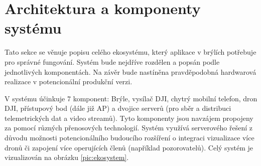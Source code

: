 \section{Architektura a komponenty systému } \label{sec:architektura}
Tato sekce se věnuje popisu celého ekosystému, který aplikace v brýlích potřebuje pro správné fungování. Systém bude nejdříve rozdělen a popsán podle jednotlivých komponentách. Na závěr bude nastíněna pravděpodobná hardwarová realizace v potencionální produkční verzi.

V systému účinkuje 7 komponent: Brýle, vysílač DJI\texttrademark, chytrý mobilní telefon, dron DJI\texttrademark, přístupový bod (dále již AP) a dvojice serverů (pro sběr a distribuci telemetrických dat a video streamů). Tyto komponenty jsou navzájem propojeny za pomocí různých přenosových technologií. Systém využívá serverového řešení z důvodu možnosti potencionálního budoucího rozšíření o integraci vizualizace více dronů či zapojení více operujících členů (například pozorovatelů).
Celý systém je vizualizován na obrázku \ref{pic:ekosystem}.
